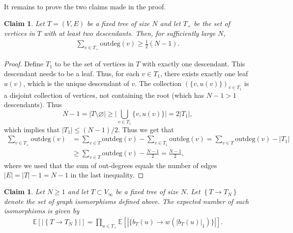 \documentclass[11pt]{article}
\numberwithin{equation}{section}
\newcommand{\E}{\mathbb{E}} %
\newtheorem{claim}[theorem]{Claim}
\theoremstyle{definition}
\begin{document}
It remains to prove the two claims made in the proof.

\begin{claim}\label{claim:2}
Let $T = (V,E)$ be a fixed tree of size $N$  and let $T_+$ be the set of vertices in $T$ with at least two descendants. Then, for sufficiently large $N$,
    \begin{align*}
    \sum_{v \in T_+} \mathrm{outdeg} (v) \geq \frac12 (N-1) .
\end{align*}
\end{claim}

\begin{proof}
Define $T_{1}$ to be the set of vertices in $T$ with exactly one descendant. This descendant needs to be a leaf. Thus, for each $v \in T_1$, there exists exactly one leaf $u(v)$, which is the unique descendant of $v$. The collection $(\{v,u(v)\})_{v \in T_1}$ is a disjoint collection of vertices, not containing the root (which has $N-1>1$ descendants). Thus
\begin{equation*}
    N-1 = |T\setminus \varnothing| \geq \Big| \bigcup_{v \in T_1} \{v,u(v)\} \Big| = 2|T_1|, %
\end{equation*}
which implies that $|T_{1}| \leq (N-1)/2$. 
Thus we get that
\begin{align*}
    \sum_{v \in T_+} \mathrm{outdeg} (v) &= \sum_{v \in T} \mathrm{outdeg} (v) - \sum_{v \in T_1} \mathrm{outdeg} (v)
    =
    \sum_{v \in T} \mathrm{outdeg} (v) - |T_1|
    \\
    &\geq
    \sum_{v \in T} \mathrm{outdeg} (v) - \frac{N-1}{2}
    =
    \frac{N-1}{2},
\end{align*}
where we used that the sum of out-degrees equals the number of edges $|E|=|T|-1=N-1$ in the last inequality. 
\end{proof}






\begin{claim}\label{claim:product}
	Let $N \geq 1$ and let $T \subset V_\infty$ be a fixed tree of size $N$.
    Let
    $\left\{ T \rightarrow T_N \right\}$ denote the set of graph isomorphisms defined above.
    The expected number of such isomorphisms is given by
	\begin{align*}
	\E\left[|\left\{ T \rightarrow T_N \right\}|\right] =
	\prod_{u\in T_+} \E \left[| \{ b_T(u) \rightarrow w \left(|b_T(u)|_1\right) \}|\right].
	\end{align*}
\end{claim}
\end{document}
